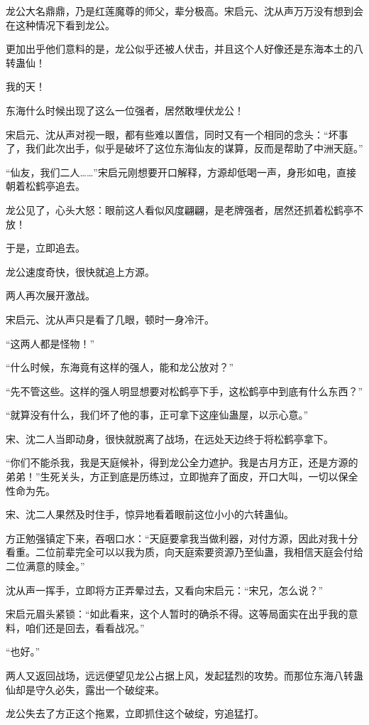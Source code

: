 \begin{this_body}
龙公大名鼎鼎，乃是红莲魔尊的师父，辈分极高。宋启元、沈从声万万没有想到会在这种情况下看到龙公。

更加出乎他们意料的是，龙公似乎还被人伏击，并且这个人好像还是东海本土的八转蛊仙！

我的天！

东海什么时候出现了这么一位强者，居然敢埋伏龙公！

宋启元、沈从声对视一眼，都有些难以置信，同时又有一个相同的念头：“坏事了，我们此次出手，似乎是破坏了这位东海仙友的谋算，反而是帮助了中洲天庭。”

“仙友，我们二人……”宋启元刚想要开口解释，方源却低喝一声，身形如电，直接朝着松鹤亭追去。

龙公见了，心头大怒：眼前这人看似风度翩翩，是老牌强者，居然还抓着松鹤亭不放！

于是，立即追去。

龙公速度奇快，很快就追上方源。

两人再次展开激战。

宋启元、沈从声只是看了几眼，顿时一身冷汗。

“这两人都是怪物！”

“什么时候，东海竟有这样的强人，能和龙公放对？”

“先不管这些。这样的强人明显想要对松鹤亭下手，这松鹤亭中到底有什么东西？”

“就算没有什么，我们坏了他的事，正可拿下这座仙蛊屋，以示心意。”

宋、沈二人当即动身，很快就脱离了战场，在远处天边终于将松鹤亭拿下。

“你们不能杀我，我是天庭候补，得到龙公全力遮护。我是古月方正，还是方源的弟弟！”生死关头，方正到底是历练过，立即抛弃了面皮，开口大叫，一切以保全性命为先。

宋、沈二人果然及时住手，惊异地看着眼前这位小小的六转蛊仙。

方正勉强镇定下来，吞咽口水：“天庭要拿我当做利器，对付方源，因此对我十分看重。二位前辈完全可以以我为质，向天庭索要资源乃至仙蛊，我相信天庭会付给二位满意的赎金。”

沈从声一挥手，立即将方正弄晕过去，又看向宋启元：“宋兄，怎么说？”

宋启元眉头紧锁：“如此看来，这个人暂时的确杀不得。这等局面实在出乎我的意料，咱们还是回去，看看战况。”

“也好。”

两人又返回战场，远远便望见龙公占据上风，发起猛烈的攻势。而那位东海八转蛊仙却是守久必失，露出一个破绽来。

龙公失去了方正这个拖累，立即抓住这个破绽，穷追猛打。


\end{this_body}

